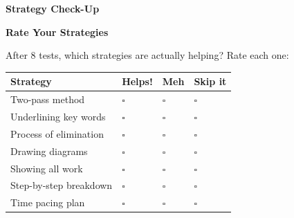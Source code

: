 \clearpage
\thispagestyle{empty}
{\sffamily

\begin{center}
{\fontsize{22}{26}\selectfont\bfseries\color{funOrange} \faClipboardCheck\hspace{3mm}Strategy Check-Up\hspace{3mm}\faClipboardCheck}

\vspace{2mm}
{\color{funGray}\hrulefill}
\end{center}

\vspace{3mm}

\begin{tcolorbox}[
    enhanced,
    colback=funOrangeLight,
    colframe=funOrange!50,
    arc=10pt,
    boxrule=1.5pt,
    left=6mm, right=6mm, top=5mm, bottom=5mm,
]
{\large\bfseries\color{funOrangeDark} \faListOl\hspace{2mm}Rate Your Strategies}

\vspace{2mm}

After 8 tests, which strategies are actually helping? Rate each one:

\vspace{3mm}

\begin{center}
\renewcommand{\arraystretch}{1.4}
\begin{tabular}{|p{3.8cm}|>{\centering\arraybackslash}p{1.5cm}|>{\centering\arraybackslash}p{1.5cm}|>{\centering\arraybackslash}p{1.5cm}|}
\hline
\rowcolor{funOrange!15} \textbf{Strategy} & \textbf{Helps!} & \textbf{Meh} & \textbf{Skip it} \\
\hline
Two-pass method & $\square$ & $\square$ & $\square$ \\
\hline
Underlining key words & $\square$ & $\square$ & $\square$ \\
\hline
Process of elimination & $\square$ & $\square$ & $\square$ \\
\hline
Drawing diagrams & $\square$ & $\square$ & $\square$ \\
\hline
Showing all work & $\square$ & $\square$ & $\square$ \\
\hline
Step-by-step breakdown & $\square$ & $\square$ & $\square$ \\
\hline
Time pacing plan & $\square$ & $\square$ & $\square$ \\
\hline
\end{tabular}
\end{center}
\end{tcolorbox}

}
